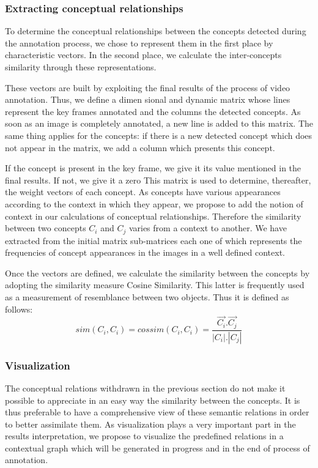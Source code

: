 	\subsubsection{Extracting conceptual relationships}

To determine the conceptual relationships between the concepts detected during the annotation process, we chose to
represent them in the first place by characteristic vectors. In
the second place, we calculate the inter-concepts similarity
through these representations.

These vectors are built by exploiting the final results of
the process of video annotation. Thus, we define a dimen
sional and dynamic matrix whose lines represent the key
frames annotated and the columns the detected concepts.
As soon as an image is completely annotated, a new line
is added to this matrix. The same thing applies for the concepts: if there is a new detected concept which does not
appear in the matrix, we add a column which presents this
concept.

If the concept is present in the key frame, we give it its
value mentioned in the final results. If not, we give it a
zero This matrix is used to determine, thereafter, the weight
vectors of each concept.
As concepts have various appearances according to the
context in which they appear, we propose to add the notion
of context in our calculations of conceptual relationships.
Therefore the similarity between two concepts $C_{i}$ and $C_{j}$
varies from a context to another. We have extracted from
the initial matrix sub-matrices each one of which represents
the frequencies of concept appearances in the images in a
well defined context.

Once the vectors are defined, we calculate the similarity
between the concepts by adopting the similarity measure
Cosine Similarity. This latter is frequently used as a measurement of resemblance between two objects. Thus it is
defined as follows:
		\begin{equation}
				sim(C_{i},C_{i}) = cossim(C_{i},C_{i}) = \frac{\vec{C_{i}} .
				\vec{C_{j}}}{|C_{i}| . |C_{j}|}
			\end{equation}

\subsubsection{Visualization}
The conceptual relations withdrawn in the previous section do not make it possible to appreciate in an easy way
the similarity between the concepts. It is thus preferable
to have a comprehensive view of these semantic relations
in order to better assimilate them. As visualization plays a
very important part in the results interpretation, we propose
to visualize the predefined relations in a contextual graph
which will be generated in progress and in the end of process of annotation.

